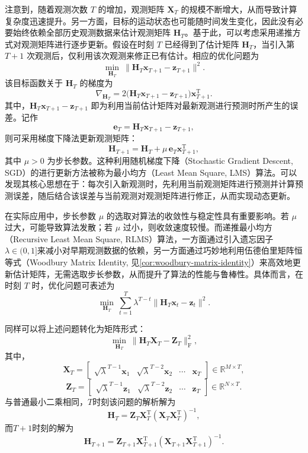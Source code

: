 注意到，随着观测次数 \(T\) 的增加，观测矩阵 \(\mathbf{X}_T\) 的规模不断增大，从而导致计算复杂度迅速提升。另一方面，目标的运动状态也可能随时间发生变化，因此没有必要始终依赖全部历史观测数据来估计观测矩阵 \(\mathbf{H}_T\)。基于此，可以考虑采用递推方式对观测矩阵进行逐步更新。假设在时刻 \(T\) 已经得到了估计矩阵 \(\mathbf{H}_{T}\)，当引入第 \(T+1\) 次观测后，仅利用该次观测来修正已有估计。相应的优化问题为
\[
    \min_{\mathbf{H}_{T}} \ \big\| \mathbf{H}_{T} \bm{x}_{T+1} - \bm{z}_{T+1} \big\|^2.
\]
该目标函数关于 \(\mathbf{H}_{T}\) 的梯度为
\[
    \nabla_{\mathbf{H}_{T}} = 2\big(\mathbf{H}_{T} \bm{x}_{T+1} - \bm{z}_{T+1}\big)\bm{x}_{T+1}^{\mathrm{T}}.
\]
其中，\(\mathbf{H}_{T}\bm{x}_{T+1}-\bm{z}_{T+1}\) 即为利用当前估计矩阵对最新观测进行预测时所产生的误差。记作
\[
    \bm{e}_{T} = \mathbf{H}_{T}\bm{x}_{T+1} - \bm{z}_{T+1},
\]
则可采用梯度下降法更新观测矩阵：
\[
    \mathbf{H}_{T+1} = \mathbf{H}_{T} + \mu\, \bm{e}_{T}\bm{x}_{T+1}^{\mathrm{T}},
\]
其中 \(\mu > 0\) 为步长参数。这种利用随机梯度下降（Stochastic Gradient Descent, SGD）的进行更新方法被称为最小均方（Least Mean Square, LMS）算法。可以发现其核心思想在于：每次引入新观测时，先利用当前观测矩阵进行预测并计算预测误差，随后结合该误差与当前观测对观测矩阵进行修正，从而实现动态更新。

在实际应用中，步长参数 \(\mu\) 的选取对算法的收敛性与稳定性具有重要影响。若 \(\mu\) 过大，可能导致算法发散；若 \(\mu\) 过小，则收敛速度较慢。而递推最小均方（Recursive Least Mean Square, RLMS）算法，一方面通过引入遗忘因子\( \lambda \in (0,1] \)来减小对早期观测数据的依赖，另一方面通过巧妙地利用伍德伯里矩阵恒等式（Woodbury Matrix Identity, 见\cref{cor:woodbury-matrix-identity}）来高效地更新估计矩阵，无需选取步长参数，从而提升了算法的性能与鲁棒性。具体而言，在时刻 \( T \) 时，优化问题可表述为
\[
    \min_{\mathbf{H}_T} \ \sum_{t=1}^{T} \lambda^{T-t} \big\| \mathbf{H}_T\bm{x}_t - \bm{z}_t \big\|^2.
\]

同样可以将上述问题转化为矩阵形式：
\[
    \min_{\mathbf{H}_T} \ \big\| \mathbf{H}_T \mathbf{X}_T - \mathbf{Z}_T\big\|_{\mathrm{F}}^2,
\]
其中，
\[
    \mathbf{X}_T = \begin{bmatrix} \sqrt{\lambda}^{T-1}\bm{x}_1 & \sqrt{\lambda}^{T-2}\bm{x}_2 & \cdots & \bm{x}_T \end{bmatrix} \in \mathbb{R}^{M \times T},
\]
\[
    \mathbf{Z}_T = \begin{bmatrix} \sqrt{\lambda}^{T-1}\bm{z}_1 & \sqrt{\lambda}^{T-2}\bm{z}_2 & \cdots & \bm{z}_T \end{bmatrix} \in \mathbb{R}^{N \times T}.
\]
与普通最小二乘相同，\( T \)时刻该问题的解析解为
\[
    \mathbf{H}_T = \mathbf{Z}_T \mathbf{X}_T^{\mathrm{T}} \left( \mathbf{X}_T \mathbf{X}_T ^{\mathrm{T}} \right)^{-1},
\]
而\( T + 1 \)时刻的解为
\[
    \mathbf{H}_{T+1} = \mathbf{Z}_{T+1} \mathbf{X}_{T+1}^{\mathrm{T}} \left( \mathbf{X}_{T+1} \mathbf{X}_{T+1} ^{\mathrm{T}} \right)^{-1}.
\]

